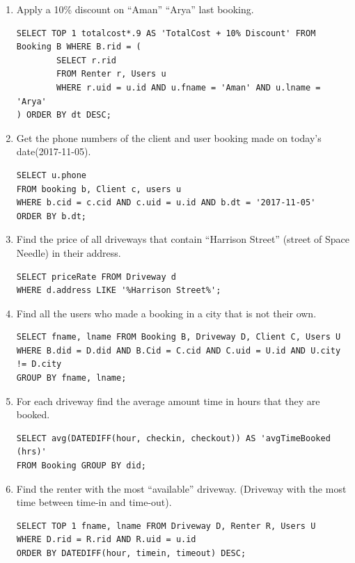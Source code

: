 \documentclass[a4paper]{article}
\begin{document}
\begin{enumerate}
\begin{enumerate}
\item Apply a 10\% discount on “Aman” “Arya” last booking.

\begin{verbatim}
SELECT TOP 1 totalcost*.9 AS 'TotalCost + 10% Discount' FROM Booking B WHERE B.rid = (
		SELECT r.rid 
		FROM Renter r, Users u 
		WHERE r.uid = u.id AND u.fname = 'Aman' AND u.lname = 'Arya'
) ORDER BY dt DESC;
\end{verbatim}

\item Get the phone numbers of the client and user booking made on today’s date(2017-11-05).

\begin{verbatim}
SELECT u.phone 
FROM booking b, Client c, users u 
WHERE b.cid = c.cid AND c.uid = u.id AND b.dt = '2017-11-05'
ORDER BY b.dt;
\end{verbatim}

\item Find the price of all driveways that contain “Harrison Street” (street of Space Needle) in their address.

\begin{verbatim}
SELECT priceRate FROM Driveway d
WHERE d.address LIKE '%Harrison Street%';
\end{verbatim}

\item Find all the users who made a booking in a city that is not their own.

\begin{verbatim}
SELECT fname, lname FROM Booking B, Driveway D, Client C, Users U
WHERE B.did = D.did AND B.Cid = C.cid AND C.uid = U.id AND U.city != D.city
GROUP BY fname, lname;
\end{verbatim}

\item For each driveway find the average amount time in hours that they are booked.

\begin{verbatim}
SELECT avg(DATEDIFF(hour, checkin, checkout)) AS 'avgTimeBooked (hrs)' 
FROM Booking GROUP BY did;
\end{verbatim}

\item Find the renter with the most “available” driveway. (Driveway with the most time between time-in and time-out).

\begin{verbatim}
SELECT TOP 1 fname, lname FROM Driveway D, Renter R, Users U 
WHERE D.rid = R.rid AND R.uid = u.id 
ORDER BY DATEDIFF(hour, timein, timeout) DESC;
\end{verbatim}


\end{enumerate}
\end{enumerate}
\end{document}

